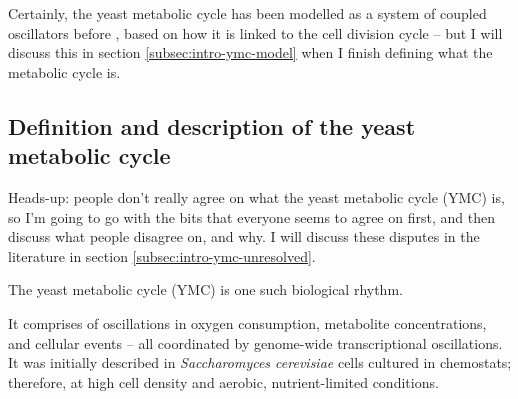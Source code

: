 Certainly, the yeast metabolic cycle has been modelled as a system of coupled oscillators before \citep{papagiannakisAutonomousMetabolicOscillations2017,ozsezenInferenceHighLevelInteraction2019}, based on how it is linked to the cell division cycle -- but I will discuss this in section \ref{subsec:intro-ymc-model} when I finish defining what the metabolic cycle is.

\subsection{Definition and description of the yeast metabolic cycle}
\label{subsec:intro-ymc-definition}


Heads-up: people don't really agree on what the yeast metabolic cycle (YMC) is, so I'm going to go with the bits that everyone seems to agree on first, and then discuss what people disagree on, and why.
I will discuss these disputes in the literature in section \ref{subsec:intro-ymc-unresolved}.


The yeast metabolic cycle (YMC) is one such biological rhythm.


It comprises of oscillations in oxygen consumption, metabolite concentrations, and cellular events -- all coordinated by genome-wide transcriptional oscillations.
It was initially described in \emph{Saccharomyces cerevisiae} cells cultured in chemostats; therefore, at high cell density and aerobic,
nutrient-limited conditions.

